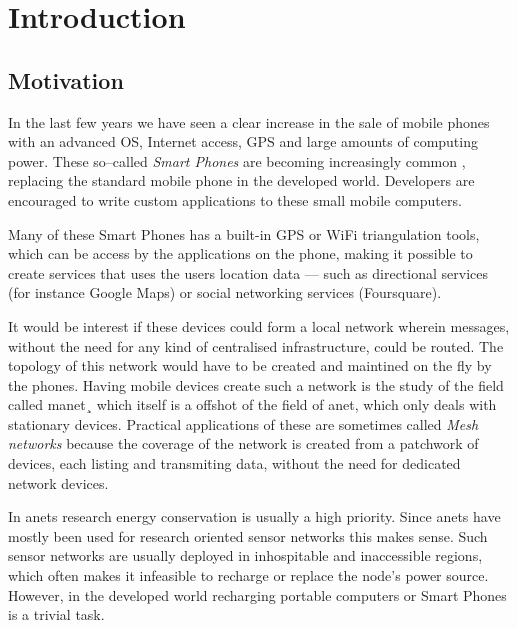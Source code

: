 \section{Introduction}
\label{section:introduction} 

\subsection{Motivation}

In the last few years we have seen a clear increase in the sale of mobile phones with an advanced OS, Internet access, GPS and large amounts of computing power. These so--called \emph{Smart Phones} are becoming increasingly common , replacing the standard mobile phone in the developed world. Developers are encouraged to write custom applications to these small mobile computers.
 
Many of these Smart Phones has a built-in GPS or WiFi triangulation tools, which can be access by the applications on the phone, making it possible to create services that uses the users location data --- such as directional services (for instance Google Maps) or social networking services (Foursquare).

It would be interest if these devices could form a local network wherein messages, without the need for any kind of centralised infrastructure, could be routed. The topology of this network would have to be created and maintined on the fly by the phones. Having mobile devices create such a network is the study of the field called \ac{manet}¸ which itself is a offshot of the field of \ac{anet}, which only deals with stationary devices. Practical applications of these are sometimes called \emph{Mesh networks} because the coverage of the network is created from a patchwork of devices, each listing and transmiting data, without the need for dedicated network devices.  

In \acp{anet} research energy conservation is usually a high priority. Since \acp{anet} have mostly been used for research oriented sensor networks this makes sense. Such sensor networks are usually deployed in inhospitable and inaccessible regions, which often makes it infeasible to recharge or replace the node's power source. However, in the developed world recharging portable computers or Smart Phones is a trivial task. 

